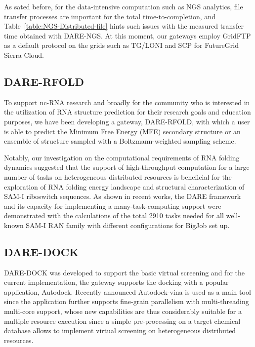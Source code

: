 \documentclass{sig-alternate}
\begin{document}
As sated before,  for the data-intensive computation such as NGS
analytics, file transfer processes are important for the total
time-to-completion, and Table~\ref{table:NGS-Distributed-file} hints
such issues with the measured transfer time obtained with DARE-NGS.
At this moment, our gateways employ GridFTP as a default protocol on
the grids such as TG/LONI and SCP for FutureGrid Sierra Cloud.

\subsection{DARE-RFOLD}
To support nc-RNA research and broadly for the community who is
interested in the utilization of RNA structure prediction for their
research goals and education purposes, we have been developing a
gateway, DARE-RFOLD, with which a user is able to predict the Minimum
Free Energy (MFE) secondary structure or an ensemble of structure
sampled with a Boltzmann-weighted sampling scheme.

Notably, our investigation on the computational requirements of RNA
folding dynamics suggested that the support of high-throughput
computation for a large number of tasks on heterogeneous distributed
resources is beneficial for the exploration of RNA folding energy
landscape and structural characterization of SAM-I riboswitch
sequences.  As shown in recent works\cite{ecmls10,ccpe11}, the
DARE framework and its capacity for implementing a many-task-computing
support were demonstrated with the calculations of the total 2910 tasks needed for all
well-known SAM-I RAN family with different configurations for BigJob
set up\cite{ecmls10}.


\subsection{DARE-DOCK}
DARE-DOCK was developed to support the basic virtual screening and for
the current implementation, the gateway supports the docking with a
popular application, Autodock\cite{autodock}.  Recently announced
Autodock-vina is used as a main tool since the application further
supports fine-grain parallelism with multi-threading multi-core
support, whose new capabilities are thus considerably suitable for a
multiple resource execution since a simple pre-processing on a target
chemical database allows to implement virtual screening on
heterogeneous distributed resources.

%
\end{document}
